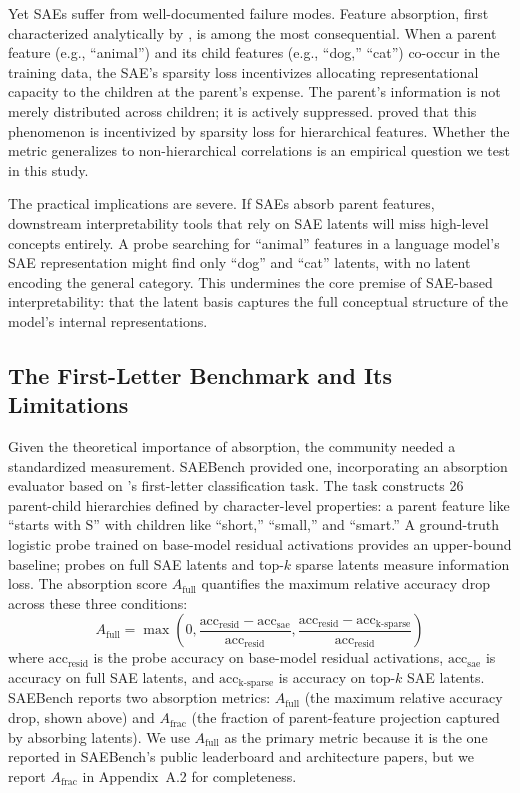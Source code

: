\documentclass{article}
\begin{document}
Yet SAEs suffer from well-documented failure modes. Feature absorption, first characterized analytically by \citet{chanin2024feature}, is among the most consequential. When a parent feature (e.g., ``animal'') and its child features (e.g., ``dog,'' ``cat'') co-occur in the training data, the SAE's sparsity loss incentivizes allocating representational capacity to the children at the parent's expense. The parent's information is not merely distributed across children; it is actively suppressed. \citet{chanin2024feature} proved that this phenomenon is incentivized by sparsity loss for hierarchical features. Whether the metric generalizes to non-hierarchical correlations is an empirical question we test in this study.

The practical implications are severe. If SAEs absorb parent features, downstream interpretability tools that rely on SAE latents will miss high-level concepts entirely. A probe searching for ``animal'' features in a language model's SAE representation might find only ``dog'' and ``cat'' latents, with no latent encoding the general category. This undermines the core premise of SAE-based interpretability: that the latent basis captures the full conceptual structure of the model's internal representations.

\subsection{The First-Letter Benchmark and Its Limitations}

Given the theoretical importance of absorption, the community needed a standardized measurement. SAEBench \citep{karvonen2025saebench} provided one, incorporating an absorption evaluator based on \citeauthor{chanin2024feature}'s first-letter classification task. The task constructs 26 parent-child hierarchies defined by character-level properties: a parent feature like ``starts with S'' with children like ``short,'' ``small,'' and ``smart.'' A ground-truth logistic probe trained on base-model residual activations provides an upper-bound baseline; probes on full SAE latents and top-$k$ sparse latents measure information loss. The absorption score $A_{\text{full}}$ quantifies the maximum relative accuracy drop across these three conditions:
\begin{equation}
A_{\text{full}} = \max\left(0, \frac{\text{acc}_{\text{resid}} - \text{acc}_{\text{sae}}}{\text{acc}_{\text{resid}}}, \frac{\text{acc}_{\text{resid}} - \text{acc}_{\text{k-sparse}}}{\text{acc}_{\text{resid}}}\right)
\end{equation}
where $\text{acc}_{\text{resid}}$ is the probe accuracy on base-model residual activations, $\text{acc}_{\text{sae}}$ is accuracy on full SAE latents, and $\text{acc}_{\text{k-sparse}}$ is accuracy on top-$k$ SAE latents. SAEBench reports two absorption metrics: $A_{\text{full}}$ (the maximum relative accuracy drop, shown above) and $A_{\text{frac}}$ (the fraction of parent-feature projection captured by absorbing latents). We use $A_{\text{full}}$ as the primary metric because it is the one reported in SAEBench's public leaderboard and architecture papers, but we report $A_{\text{frac}}$ in Appendix~A.2 for completeness.
\end{document}
